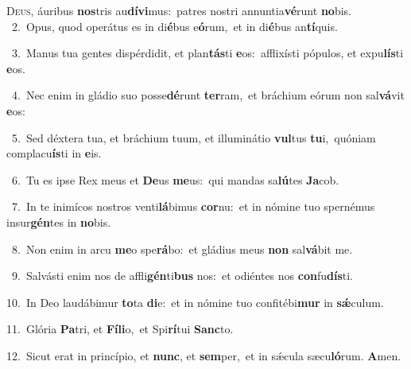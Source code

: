 \lettrine{\initial\textcolor{\initialcolor}{D}}{eus,} áuribus \textbf{nos}\-tris au\-\textbf{dí}\-\textbf{vi}mus:~\star patres nostri annuntia\-\textbf{vé}\-runt \textbf{no}\-bis.\\
{\numbfont\textcolor{\numbcolor}{~2.}}~Opus, quod operátus es in di\-\textbf{é}\-bus e\-\textbf{ó}\-rum,~\star et in di\-\textbf{é}\-bus an\-\textbf{tí}\-quis.\par
{\numbfont\textcolor{\numbcolor}{~3.}}~Manus tua gentes dispérdidit, et plan\-\textbf{tás}\-ti \textbf{e}\-os:~\star afflixísti pópulos, et expu\-\textbf{lís}\-ti \textbf{e}\-os.\par
{\numbfont\textcolor{\numbcolor}{~4.}}~Nec enim in gládio suo posse\-\textbf{dé}\-runt \textbf{ter}\-ram,~\star et bráchium eórum non sal\-\textbf{vá}\-vit \textbf{e}\-os:\par
{\numbfont\textcolor{\numbcolor}{~5.}}~Sed déxtera tua, et bráchium tuum, et illuminátio \textbf{vul}\-tus \textbf{tu}\-i,~\star quóniam complacu\-\textbf{ís}\-ti in \textbf{e}\-is.\par
{\numbfont\textcolor{\numbcolor}{~6.}}~Tu es ipse Rex meus et \textbf{De}\-us \textbf{me}\-us:~\star qui mandas sa\-\textbf{lú}\-tes \textbf{Ja}\-cob.\par
{\numbfont\textcolor{\numbcolor}{~7.}}~In te inimícos nostros venti\-\textbf{lá}\-bimus \textbf{cor}\-nu:~\star et in nómine tuo spernémus insur\-\textbf{gén}\-tes in \textbf{no}\-bis.\par
{\numbfont\textcolor{\numbcolor}{~8.}}~Non enim in arcu \textbf{me}\-o spe\-\textbf{rá}\-bo:~\star et gládius meus \textbf{non} sal\-\textbf{vá}\-bit me.\par
{\numbfont\textcolor{\numbcolor}{~9.}}~Salvásti enim nos de affli\-\textbf{gén}\-ti\textbf{bus} nos:~\star et odiéntes nos \textbf{con}\-fu\-\textbf{dís}\-ti.\par
{\numbfont\textcolor{\numbcolor}{10.}}~In Deo laudábimur \textbf{to}\-ta \textbf{di}\-e:~\star et in nómine tuo confitébi\textbf{mur} in \textbf{sǽ}\-culum.\par
{\numbfont\textcolor{\numbcolor}{11.}}~Glória \textbf{Pa}\-tri, et \textbf{Fí}\-\textbf{li}o,~\star et Spi\-\textbf{rí}\-tui \textbf{Sanc}\-to.\par
{\numbfont\textcolor{\numbcolor}{12.}}~Sicut erat in princípio, et \textbf{nunc}\-, et \textbf{sem}\-per,~\star et in sǽcula sæcu\-\textbf{ló}\-rum. \textbf{A}\-men.\par
